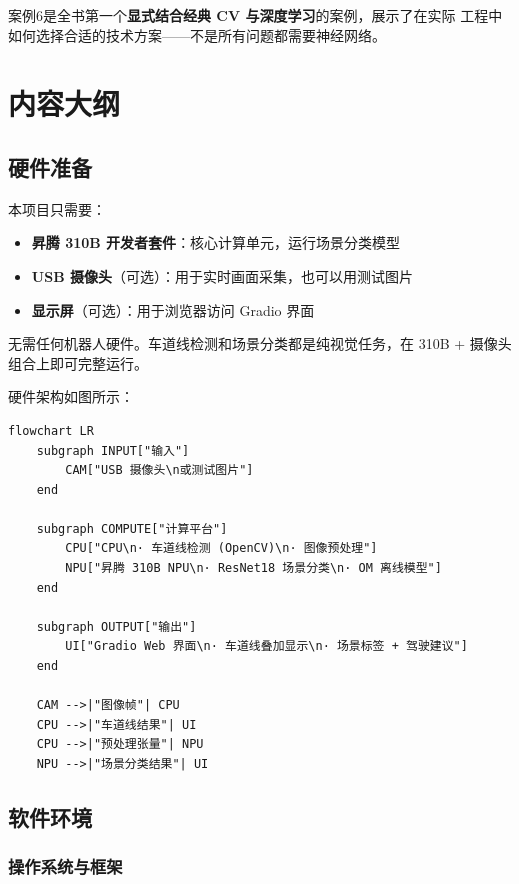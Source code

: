 案例6是全书第一个\textbf{显式结合经典 CV 与深度学习}的案例，展示了在实际
工程中如何选择合适的技术方案------不是所有问题都需要神经网络。

\section{内容大纲}\label{src-experiment-case6-h3}

\subsection{硬件准备}\label{src-experiment-case6-h4}

本项目只需要：

\begin{itemize}
\tightlist
\item
  \textbf{昇腾 310B 开发者套件}：核心计算单元，运行场景分类模型
\item
  \textbf{USB 摄像头}（可选）：用于实时画面采集，也可以用测试图片
\item
  \textbf{显示屏}（可选）：用于浏览器访问 Gradio 界面
\end{itemize}

无需任何机器人硬件。车道线检测和场景分类都是纯视觉任务，在 310B +
摄像头组合上即可完整运行。

硬件架构如图所示：

\begin{lstlisting}
flowchart LR
    subgraph INPUT["输入"]
        CAM["USB 摄像头\n或测试图片"]
    end

    subgraph COMPUTE["计算平台"]
        CPU["CPU\n· 车道线检测 (OpenCV)\n· 图像预处理"]
        NPU["昇腾 310B NPU\n· ResNet18 场景分类\n· OM 离线模型"]
    end

    subgraph OUTPUT["输出"]
        UI["Gradio Web 界面\n· 车道线叠加显示\n· 场景标签 + 驾驶建议"]
    end

    CAM -->|"图像帧"| CPU
    CPU -->|"车道线结果"| UI
    CPU -->|"预处理张量"| NPU
    NPU -->|"场景分类结果"| UI
\end{lstlisting}

\subsection{软件环境}\label{src-experiment-case6-h5}

\subsubsection{操作系统与框架}\label{src-experiment-case6-h6}

